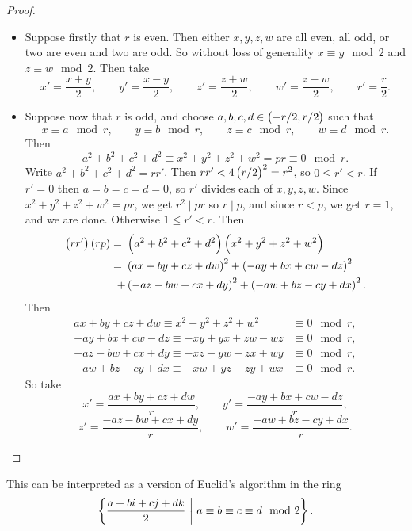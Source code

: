 \begin{proof}
\hfill
\begin{itemize}
\item Suppose firstly that $ r $ is even. Then either $ x, y, z, w $ are all even, all odd, or two are even and two are odd. So without loss of generality $ x \equiv y \mod 2 $ and $ z \equiv w \mod 2 $. Then take
$$ x' = \dfrac{x + y}{2}, \qquad y' = \dfrac{x - y}{2}, \qquad z' = \dfrac{z + w}{2}, \qquad w' = \dfrac{z - w}{2}, \qquad r' = \dfrac{r}{2}. $$

\pagebreak

\item Suppose now that $ r $ is odd, and choose $ a, b, c, d \in \br{-r / 2, r / 2} $ such that
$$ x \equiv a \mod r, \qquad y \equiv b \mod r, \qquad z \equiv c \mod r, \qquad w \equiv d \mod r. $$
Then
$$ a^2 + b^2 + c^2 + d^2 \equiv x^2 + y^2 + z^2 + w^2 = pr \equiv 0 \mod r. $$
Write $ a^2 + b^2 + c^2 + d^2 = rr' $. Then $ rr' < 4\br{r / 2}^2 = r^2 $, so $ 0 \le r' < r $. If $ r' = 0 $ then $ a = b = c = d = 0 $, so $ r' $ divides each of $ x, y, z, w $. Since $ x^2 + y^2 + z^2 + w^2 = pr $, we get $ r^2 \mid pr $ so $ r \mid p $, and since $ r < p $, we get $ r = 1 $, and we are done. Otherwise $ 1 \le r' < r $. Then
\begin{align*}
\br{rr'}\br{rp}
= \ & \br{a^2 + b^2 + c^2 + d^2}\br{x^2 + y^2 + z^2 + w^2} \\
= \ & \br{ax + by + cz + dw}^2 + \br{-ay + bx + cw - dz}^2 \\
+ & \br{-az - bw + cx + dy}^2 + \br{-aw + bz - cy + dx}^2.
\end{align*}
Then
\begin{align*}
ax + by + cz + dw \equiv x^2 + y^2 + z^2 + w^2 & \equiv 0 \mod r, \\
-ay + bx + cw - dz \equiv -xy + yx + zw - wz & \equiv 0 \mod r, \\
-az - bw + cx + dy \equiv -xz - yw + zx + wy & \equiv 0 \mod r, \\
-aw + bz - cy + dx \equiv -xw + yz - zy + wx & \equiv 0 \mod r.
\end{align*}
So take
$$ x' = \dfrac{ax + by + cz + dw}{r}, \qquad y' = \dfrac{-ay + bx + cw - dz}{r}, $$
$$ z' = \dfrac{-az - bw + cx + dy}{r}, \qquad w' = \dfrac{-aw + bz - cy + dx}{r}. $$
\end{itemize}
\end{proof}

\begin{remark}
This can be interpreted as a version of Euclid's algorithm in the ring
$$ \cbr{\dfrac{a + bi + cj + dk}{2} \st a \equiv b \equiv c \equiv d \mod 2}. $$
\end{remark}

